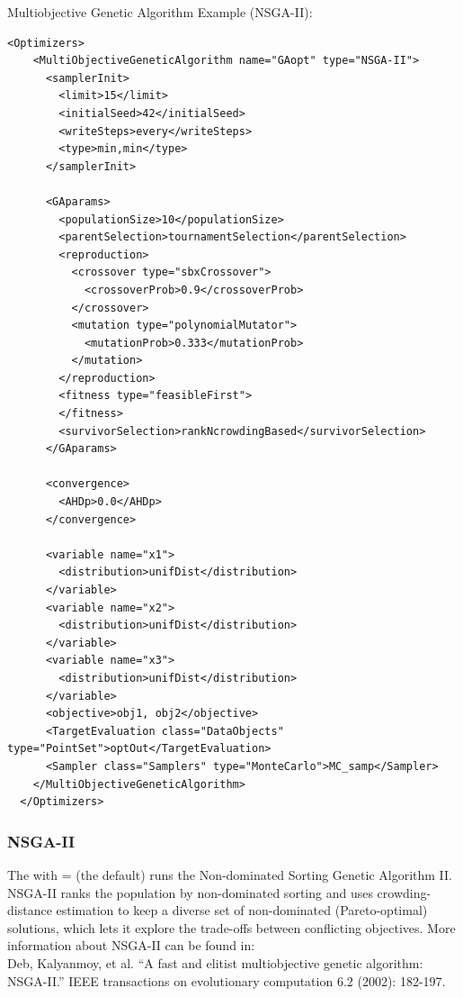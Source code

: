 \hspace{24pt}
Multiobjective Genetic Algorithm Example (NSGA-II):
\begin{lstlisting}[style=XML]
  <Optimizers>
    <MultiObjectiveGeneticAlgorithm name="GAopt" type="NSGA-II">
      <samplerInit>
        <limit>15</limit>
        <initialSeed>42</initialSeed>
        <writeSteps>every</writeSteps>
        <type>min,min</type>
      </samplerInit>

      <GAparams>
        <populationSize>10</populationSize>
        <parentSelection>tournamentSelection</parentSelection>
        <reproduction>
          <crossover type="sbxCrossover">
            <crossoverProb>0.9</crossoverProb>
          </crossover>
          <mutation type="polynomialMutator">
            <mutationProb>0.333</mutationProb>
          </mutation>
        </reproduction>
        <fitness type="feasibleFirst">
        </fitness>
        <survivorSelection>rankNcrowdingBased</survivorSelection>
      </GAparams>

      <convergence>
        <AHDp>0.0</AHDp>
      </convergence>

      <variable name="x1">
        <distribution>unifDist</distribution>
      </variable>
      <variable name="x2">
        <distribution>unifDist</distribution>
      </variable>
      <variable name="x3">
        <distribution>unifDist</distribution>
      </variable>
      <objective>obj1, obj2</objective>
      <TargetEvaluation class="DataObjects" type="PointSet">optOut</TargetEvaluation>
      <Sampler class="Samplers" type="MonteCarlo">MC_samp</Sampler>
    </MultiObjectiveGeneticAlgorithm>
  </Optimizers>
\end{lstlisting}


\subsubsection{NSGA-II}
  The  with =
  (the default) runs the Non-dominated Sorting Genetic Algorithm II. NSGA-II
  ranks the population by non-dominated sorting and uses crowding-distance
  estimation to keep a diverse set of non-dominated (Pareto-optimal) solutions,
  which lets it explore the trade-offs between conflicting objectives. More
  information about NSGA-II can be found in:\\                              Deb, Kalyanmoy, et al.
  ``A fast and elitist multiobjective genetic algorithm:                             NSGA-II.'' IEEE
  transactions on evolutionary computation 6.2 (2002): 182-197.

